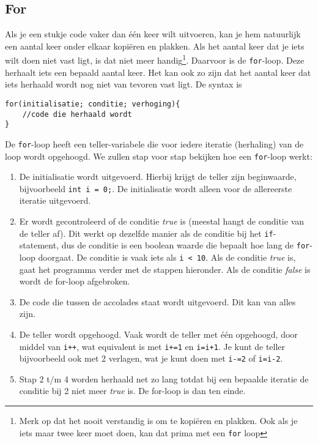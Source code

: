 \documentclass[12pt,a4paper]{article}
\newcommand{\icode}{\lstinline}
\begin{document}
\subsection{For}
Als je een stukje code vaker dan \'e\'en keer wilt uitvoeren, kan je hem natuurlijk een aantal keer onder elkaar kopi\"eren en plakken. Als het aantal keer dat je iets wilt doen niet vast ligt, is dat niet meer handig\footnote{Merk op dat het nooit verstandig is om te kopi\"eren en plakken. Ook als je iets maar twee keer moet doen, kan dat prima met een \icode{for} loop}. Daarvoor is de \icode{for}-loop.
Deze herhaalt iets een bepaald aantal keer. Het kan ook zo zijn dat het aantal keer dat iets herhaald wordt nog niet van tevoren vast ligt. De syntax is 
\begin{lstlisting}
for(initialisatie; conditie; verhoging){
	//code die herhaald wordt
}
\end{lstlisting}
De \icode{for}-loop heeft een teller-variabele die voor iedere iteratie (herhaling) van de loop wordt opgehoogd. We zullen stap voor stap bekijken hoe een \icode{for}-loop werkt:

\begin{enumerate}
	\item De initialisatie wordt uitgevoerd. Hierbij krijgt de teller zijn beginwaarde, bijvoorbeeld \icode{int i = 0;}. De initialisatie wordt alleen voor de allereerste iteratie uitgevoerd. 
	\item Er wordt gecontroleerd of de conditie \emph{true} is (meestal hangt de conditie van de teller af). Dit werkt op dezelfde manier als de conditie bij het \icode{if}-statement, dus de conditie is een boolean waarde die bepaalt hoe lang de \icode{for}-loop doorgaat. De conditie is vaak iets als \icode{i < 10}. Als de conditie \emph{true} is, gaat het programma verder met de stappen hieronder. Als de conditie \emph{false} is wordt de for-loop afgebroken. 
	\item De code die tussen de accolades staat wordt uitgevoerd. Dit kan van alles zijn. 
	\item De teller wordt opgehoogd. Vaak wordt de teller met \'e\'en opgehoogd, door middel van \icode{i++}, wat equivalent is met \icode{i+=1} en \icode{i=i+1}. Je kunt de teller bijvoorbeeld ook met 2 verlagen, wat je kunt doen met \icode{i-=2} of \icode{i=i-2}.
	\item Stap 2 t/m 4 worden herhaald net zo lang totdat bij een bepaalde iteratie de conditie bij 2 niet meer \emph{true} is. De for-loop is dan ten einde. 
\end{enumerate}
\end{document}
